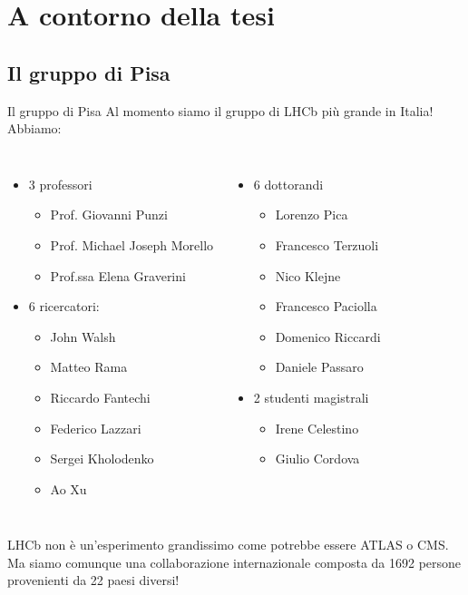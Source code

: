 \documentclass[
10pt,
aspectratio=169,
]{beamer}
\begin{document}
\section{A contorno della tesi}
\subsection{Il gruppo di Pisa}
\begin{frame}{Il gruppo di Pisa}
    Al momento siamo il gruppo di LHCb più grande in Italia!
    Abbiamo:
    \begin{columns}
    \begin{itemize}
        \item 3 professori
        \begin{itemize}
            \item Prof. Giovanni Punzi
            \item Prof. Michael Joseph Morello
            \item Prof.ssa Elena Graverini
        \end{itemize}
        \item 6 ricercatori:
        \begin{itemize}
            \item John Walsh
            \item Matteo Rama
            \item Riccardo Fantechi
            \item Federico Lazzari
            \item Sergei Kholodenko
            \item Ao Xu
        \end{itemize}
        \end{itemize}
        \begin{itemize}
        \item 6 dottorandi
        \begin{itemize}
            \item Lorenzo Pica
            \item Francesco Terzuoli
            \item Nico Klejne
            \item Francesco Paciolla
            \item Domenico Riccardi
            \item Daniele Passaro
        \end{itemize}
        \item 2 studenti magistrali
        \begin{itemize}
            \item Irene Celestino
            \item Giulio Cordova
        \end{itemize}
    \end{itemize}
        \end{columns}
        \vfill
LHCb non è un'esperimento grandissimo come potrebbe essere ATLAS o CMS. \\
Ma siamo comunque una collaborazione internazionale composta da 1692 persone provenienti da 22 paesi diversi!
\end{frame}
\end{document}
